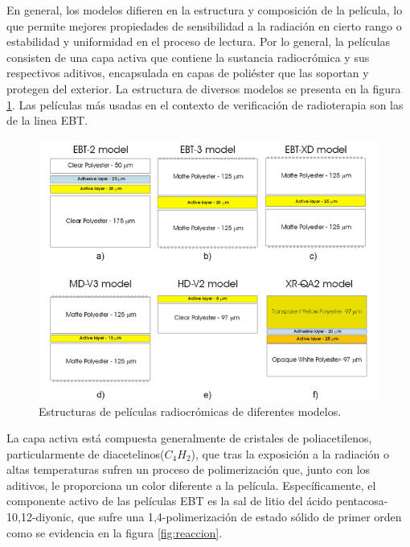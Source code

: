 En general, los modelos difieren en la estructura y composición de la película, lo que permite mejores propiedades de sensibilidad a la radiación en cierto rango o estabilidad y uniformidad en el proceso de lectura. Por lo general, la películas consisten de una capa activa que contiene la sustancia radiocrómica y sus respectivos aditivos, encapsulada en capas de poliéster que las soportan y protegen del exterior. La estructura de diversos modelos se presenta en la figura \ref{fig:Estructuras}. Las películas más usadas en el contexto de verificación de radioterapia son las de la linea EBT\cite{Devic2016}.\\
\begin{figure}[H]
	\centering
	\includegraphics[width=\linewidth]{images/modelos.png}
	\caption{Estructuras de películas radiocrómicas de diferentes modelos\cite{Devic2016}.}
	\label{fig:Estructuras}
\end{figure}

La capa activa está compuesta generalmente de cristales de poliacetilenos\cite{Williams2011}, particularmente de diacetelinos($C_4H_2$), que tras la exposición a la radiación o altas temperaturas sufren un proceso de polimerización que, junto con los aditivos, le proporciona un color diferente a la película. Específicamente, el componente activo de las películas EBT es la sal de litio del ácido pentacosa-10,12-diyonic, que sufre una 1,4-polimerización de estado sólido de primer orden como se evidencia en la figura \ref{fig:reaccion}.\\  


